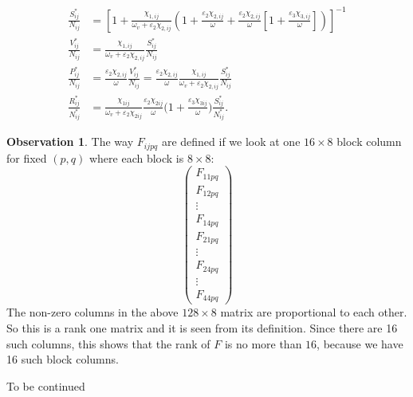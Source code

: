 \documentclass[12pt]{amsart}
\theoremstyle{definition}
\newtheorem{observation}[theorem]{{\color{red}Observation}}
\begin{document}
\begin{equation}\label{si-def}
\begin{aligned}
\frac{S_{ij}^*}{N_{ij}}&= \left\lbrack
1+\frac{\chi_{1,ij}}{\omega_v+\varepsilon_2\chi_{2,ij}}
\left(1+\frac{\varepsilon_{2}\chi_{2,ij}}{\omega}+
\frac{\varepsilon_{2}\chi_{2,ij}}{\omega}\left\lbrack
1+\frac{\varepsilon_{3}\chi_{3,ij}}{\omega}
\right\rbrack
\right)
\right\rbrack^{-1}\\
\frac{V_{ij}^*}{N_{ij}}&=  \frac{\chi_{1,ij}}{\omega_{v}+\varepsilon_2\chi_{2,ij}} \frac{S_{ij}^*}{N_{ij}}\\
\frac{P_{ij}^*}{N_{ij}}&= \frac{\varepsilon_{2}\chi_{2,ij}}{\omega}\frac{V_{ij}^*}{N_{ij}}=
\frac{\varepsilon_{2}\chi_{2,ij}}{\omega}
\frac{\chi_{1,ij}}{\omega_{v}+\varepsilon_2\chi_{2,ij}} \frac{S_{ij}^*}{N_{ij}} \\
 \frac{R_{ij}^*}{N^*_{ij}}&=
\frac{\chi_{1ij}}{\omega_v+\varepsilon_2 \chi_{2ij}}
\frac{\varepsilon_2 \chi_{2ij}}{\omega}
\Big(1+\frac{\varepsilon_3 \chi_{3ij}}{\omega}\Big)
\frac{S_{ij}^*}{N^*_{ij}}.
\end{aligned}
\end{equation}


\begin{observation}
The way $F_{ijpq}$ are defined if we look at one $16\times 8$ block column for fixed $(p,q)$ where each block is $8\times 8$:
\begin{equation}
\begin{pmatrix}
F_{11pq}\\
F_{12pq}\\
\vdots\\
F_{14pq}\\
F_{21pq}\\
\vdots\\
F_{24pq}\\
\vdots\\
F_{44pq}
\end{pmatrix}
\end{equation}
The non-zero columns in the above $128\times 8$ matrix are proportional to each other. So this is a rank one matrix and it is seen from its definition. Since there are 16 such columns, this shows that the rank of $F$ is no more than $16$, because we have 16 such block columns. 
\end{observation}

\hrulefill

\centerline{To be continued}

\hrulefill
\end{document}
